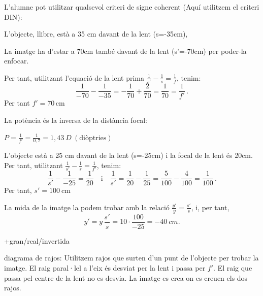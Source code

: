 \begin{solapartat}
L'alumne pot utilitzar qualsevol criteri de signe coherent (Aquí utilitzem el criteri DIN):

 L'objecte, llibre, està a 35 cm davant de la lent (s=-35cm),

 La imatge ha d'estar a 70cm també davant de la lent (s'=-70cm) per poder-la enfocar.

 Per tant, utilitzant l'equació de la lent prima $\frac{1}{s'} - \frac{1}{s} = \frac{1}{f}$, tenim:
\[ \frac{1}{-70} - \frac{1}{-35} = -\frac{1}{70} + \frac{2}{70} = \frac{1}{70} = \frac{1}{f'}\,. \]
Per tant $f' = 70\,\mathrm{cm}$

 La potència és la inversa de la distància focal:

 $P = \frac{1}{f'} = \frac{1}{0,7} = 1,43\ D\ (\text{diòptries})$
\end{solapartat}

\begin{solapartat}
 L'objecte està a 25 cm davant de la lent (s=-25cm) i la focal de la lent és 20cm. Per tant, utilitzant $\frac{1}{s'} - \frac{1}{s} = \frac{1}{f'}$, tenim:
\[ \frac{1}{s'} - \frac{1}{-25} = \frac{1}{20} \quad\text{i}\quad \frac{1}{s'} = \frac{1}{20} - \frac{1}{25} = \frac{5}{100} - \frac{4}{100} = \frac{1}{100}\,. \]
Per tant, $s' = 100\ \mathrm{cm}$

 La mida de la imatge la podem trobar amb la relació $\frac{y'}{y} = \frac{s'}{s}$, i, per tant,
\[ y' = y\,\frac{s'}{s} = 10\cdot\frac{100}{-25} = -40\ cm. \]

 +gran/real/invertida

 diagrama de rajos: Utilitzem rajos que surten d'un punt de l'objecte per trobar la imatge. El raig paral·lel a l'eix és desviat per la lent i passa per $f'$. El raig que passa pel centre de la lent no es desvia. La imatge es crea on es creuen els dos rajos.
\end{solapartat}

